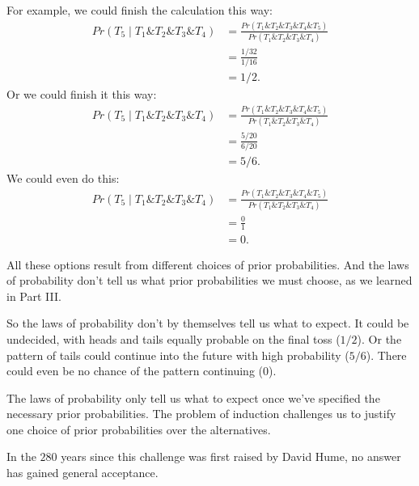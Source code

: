 \documentclass[justified]{tufte-book}
\newcommand{\given}{\mid}
\renewcommand{\wedge}{\mathbin{\&}}
\newcommand{\p}{Pr}
\begin{document}
For example, we could finish the calculation this way:
\[
  \begin{aligned}
    \p(T_5 \given T_1 \wedge T_2 \wedge T_3 \wedge T_4) 
      &= \frac{\p(T_1 \wedge T_2 \wedge T_3 \wedge T_4 \wedge T_5)}
              {\p(T_1 \wedge T_2 \wedge T_3 \wedge T_4)}\\
      &= \frac{1/32}{1/16}\\
      &= 1/2.
  \end{aligned}
\]
Or we could finish it this way:
\[
  \begin{aligned}
    \p(T_5 \given T_1 \wedge T_2 \wedge T_3 \wedge T_4) 
      &= \frac{\p(T_1 \wedge T_2 \wedge T_3 \wedge T_4 \wedge T_5)}
              {\p(T_1 \wedge T_2 \wedge T_3 \wedge T_4)}\\
      &= \frac{5/20}{6/20}\\
      &= 5/6.
  \end{aligned}
\]
We could even do this:
\[
  \begin{aligned}
    \p(T_5 \given T_1 \wedge T_2 \wedge T_3 \wedge T_4) 
      &= \frac{\p(T_1 \wedge T_2 \wedge T_3 \wedge T_4 \wedge T_5)}
              {\p(T_1 \wedge T_2 \wedge T_3 \wedge T_4)}\\
      &= \frac{0}{1}\\
      &= 0.
  \end{aligned}
\]

All these options result from different choices of prior probabilities. And the laws of probability don't tell us what prior probabilities we must choose, as we learned in Part III.

So the laws of probability don't by themselves tell us what to expect. It could be undecided, with heads and tails equally probable on the final toss (\(1/2\)). Or the pattern of tails could continue into the future with high probability (\(5/6\)). There could even be no chance of the pattern continuing (\(0\)).

The laws of probability only tell us what to expect once we've specified the necessary prior probabilities. The problem of induction challenges us to justify one choice of prior probabilities over the alternatives.

In the \(280\) years since this challenge was first raised by David Hume, no answer has gained general acceptance.
\end{document}
